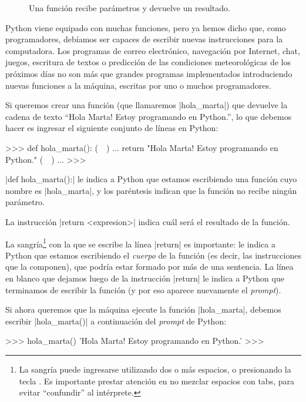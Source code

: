 \begin{figure}[ht]
\caption{Una función recibe parámetros y devuelve un resultado.}
\begin{center}

\end{center}
\end{figure}

Python viene equipado con muchas funciones, pero ya hemos dicho que, como
programadores, debíamos ser capaces de escribir nuevas instrucciones para la
computadora. Los programas de correo electrónico, navegación por Internet,
chat, juegos, escritura de textos o predicción de las condiciones
meteorológicas de los próximos días no son más que grandes programas
implementados introduciendo nuevas funciones a la máquina, escritas por uno o
muchos programadores.

Si queremos crear una función (que llamaremos |hola_marta|) que devuelve la
cadena de texto ``Hola Marta! Estoy programando en Python.'', lo que debemos
hacer es ingresar el siguiente conjunto de líneas en Python:

\begin{codigo-python-sn}
>>> def hola_marta(): (~~)
...     return "Hola Marta! Estoy programando en Python." (~~)
...
>>>
\end{codigo-python-sn}

 |def hola_marta():| le indica a Python que estamos escribiendo una función cuyo
nombre es |hola_marta|, y los paréntesis indican que la función no recibe ningún
parámetro.

 La instrucción |return <expresion>| indica cuál será el resultado
de la función.

La sangría\footnote{La sangría puede ingresarse utilizando dos o más espacios,
o presionando la tecla . Es importante prestar atención en no mezclar
espacios con tabs, para evitar ``confundir'' al intérprete.} con la que se
escribe la línea |return| es importante: le indica a Python que estamos
escribiendo el \emph{cuerpo} de la función (es decir, las instrucciones que la
componen), que podría estar formado por más de una sentencia.  La línea en
blanco que dejamos luego de la instrucción |return| le indica a Python que
terminamos de escribir la función (y por eso aparece nuevamente el
\emph{prompt}).

Si ahora queremos que la máquina ejecute la función |hola_marta|, debemos
escribir |hola_marta()| a continuación del \emph{prompt} de Python:

\begin{codigo-python-sn}
>>> hola_marta()
'Hola Marta! Estoy programando en Python.'
>>>
\end{codigo-python-sn}

